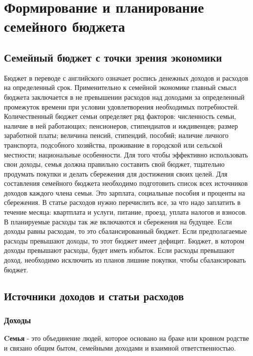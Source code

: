
\section{Формирование и планирование семейного бюджета}

\subsection{Семейный бюджет с точки зрения экономики}

Бюджет в переводе с английского означает роспись денежных доходов и
расходов на определенный срок. Применительно к семейной экономике главный смысл бюджета заключается в не превышении расходов над доходами
за определенный промежуток времени при условии удовлетворения необходимых потребностей.
Количественный бюджет семьи определяет ряд факторов: численность
семьи, наличие в ней работающих; пенсионеров, стипендиатов и иждивенцев; размер заработной платы; величина пенсий, стипендий, пособий; наличие личного транспорта, подсобного хозяйства, проживание в городской или
сельской местности; национальные особенности.
Для того чтобы эффективно использовать свои доходы, семья должна правильно составить свой бюджет, тщательно продумать покупки и делать сбережения для достижения своих целей. Для составления семейного бюджета
необходимо подготовить список всех источников доходов каждого члена семьи. Это зарплата, социальные пособия и проценты на сбережения. В статье
расходов нужно перечислить все, за что надо заплатить в течение месяца:
квартплата и услуги, питание, проезд, уплата налогов и взносов. В планируемые расходы так же включаются и сбережения на будущее.
Если доходы равны расходам, то это сбалансированный бюджет. Если
предполагаемые расходы превышают доходы, то этот бюджет имеет дефицит. Бюджет, в котором доходы превышают расходы, будет иметь избыток.
Если расходы превышают доход, необходимо исключить из планов лишние
покупки, чтобы сбалансировать бюджет.

\subsection{Источники доходов и статьи расходов}

\subsubsection{Доходы}

\textbf{Cемья} - это объединение людей, которое основано на браке или кровном родстве и связано общим бытом, семейными доходами и взаимной ответственностью.

